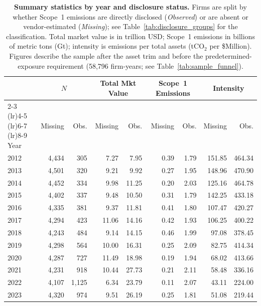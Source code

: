\documentclass[a4paper,12pt]{article}
\begin{document}
\begin{table}[htbp]
\small
\centering
\caption{\textbf{Summary statistics by year and disclosure status.} Firms are split by whether Scope~1 emissions are directly disclosed (\emph{Observed}) or are absent or vendor-estimated (\emph{Missing}); see Table~\ref{tab:disclosure_groups} for the classification. Total market value is in trillion USD; Scope~1 emissions in billions of metric tons (Gt); intensity is emissions per total assets (tCO$_2$ per \$Million). Figures describe the sample after the asset trim and before the predetermined-exposure requirement (58{,}796 firm-years; see Table~\ref{tab:sample_funnel}).}
\label{tab:summary_disclosure}
\begin{tabular}{l rr rr rr rr}
\toprule
& \multicolumn{2}{c}{$N$} & \multicolumn{2}{c}{Total Mkt Value} & \multicolumn{2}{c}{Scope~1 Emissions} & \multicolumn{2}{c}{Intensity} \\
\cmidrule(lr){2-3} \cmidrule(lr){4-5} \cmidrule(lr){6-7} \cmidrule(lr){8-9}
Year & Missing & Obs. & Missing & Obs. & Missing & Obs. & Missing & Obs. \\
\midrule
2012 & 4{,}434 &   305 &  7.27 &  7.95 & 0.39 & 1.79 & 151.85 & 464.34 \\
2013 & 4{,}501 &   320 &  9.21 &  9.92 & 0.27 & 1.95 & 148.96 & 470.90 \\
2014 & 4{,}452 &   334 &  9.98 & 11.25 & 0.20 & 2.03 & 125.16 & 464.78 \\
2015 & 4{,}402 &   337 &  9.48 & 10.50 & 0.31 & 1.79 & 142.25 & 433.18 \\
2016 & 4{,}335 &   381 &  9.37 & 11.81 & 0.41 & 1.80 & 107.47 & 420.27 \\
2017 & 4{,}294 &   423 & 11.06 & 14.16 & 0.42 & 1.93 & 106.25 & 400.22 \\
2018 & 4{,}243 &   484 &  9.14 & 14.15 & 0.46 & 1.99 &  97.08 & 378.45 \\
2019 & 4{,}298 &   564 & 10.00 & 16.31 & 0.25 & 2.09 &  82.75 & 414.34 \\
2020 & 4{,}287 &   727 & 11.49 & 18.98 & 0.19 & 1.94 &  68.02 & 413.66 \\
2021 & 4{,}231 &   918 & 10.44 & 27.73 & 0.21 & 2.11 &  58.48 & 336.16 \\
2022 & 4{,}107 & 1{,}125 &  6.34 & 23.79 & 0.11 & 2.07 &  43.11 & 224.00 \\
2023 & 4{,}320 &   974 &  9.51 & 26.19 & 0.25 & 1.81 &  51.08 & 219.44 \\
\bottomrule
\end{tabular}
\end{table}
\end{document}
